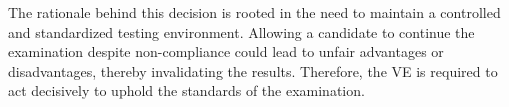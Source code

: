 The rationale behind this decision is rooted in the need to maintain a controlled and standardized testing environment. Allowing a candidate to continue the examination despite non-compliance could lead to unfair advantages or disadvantages, thereby invalidating the results. Therefore, the VE is required to act decisively to uphold the standards of the examination.

